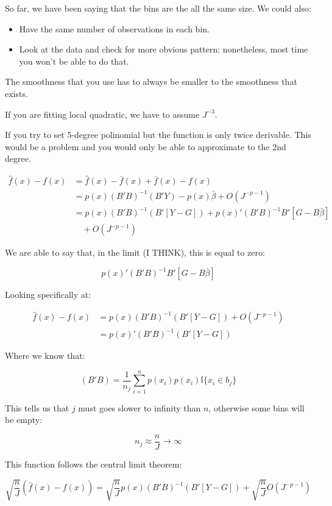 \documentclass{article}
\begin{document}
So far, we have been saying that the bins are the all the same size. We could also:

\begin{itemize}
    \item Have the same number of observations in each bin.
    \item Look at the data and check for more obvious pattern: nonetheless, most time you won't be able to do that.
\end{itemize}

The smoothness that you use has to always be smaller to the smoothness that exists.

If you are fitting local quadratic, we have to assume $J^{-3}$.

If you try to set 5-degree polinomial but the function is only twice derivable. This would be a problem and you would only be able to approximate to the 2nd degree.

\begin{align*}
    \hat{f}(x) - f(x) &= \hat{f}(x) - \bar{f}(x) + \bar{f}(x) - f(x) \\
    &= p(x) (B' B)^{-1} (B' Y) - p(x) \bar{\beta} + O(J^{-p-1}) \\
    &= p(x) (B' B)^{-1} (B' [Y-G]) + p(x)' (B' B)^{-1} B' [G - B \bar{\beta}] \\
    &\quad + O(J^{-p-1})
\end{align*}

We are able to say that, in the limit (I THINK), this is equal to zero:

$$
p(x)' (B' B)^{-1} B' [G - B \bar{\beta}] 
$$

Looking specifically at:

\begin{align*}
    \hat{f}(x) - f(x) &= p(x) (B' B)^{-1} (B' [Y-G]) + O(J^{-p-1}) \\
    &= p(x)' (B'B)^{-1} (B' [Y - G])
\end{align*}

Where we know that:

$$
(B'B) = \frac{1}{n_j} \sum_{i=1}^{n} p(x_i)p(x_i) \mathbb{I} \{ x_i \in b_j \}
$$

This tells us that $j$ must goes slower to infinity than $n$, otherwise some bins will be empty:

$$
n_j \approx \frac{n}{J} \to \infty
$$

This function follows the central limit theorem:

$$
\sqrt{\frac{n}{J}} (\hat{f}(x) - f(x)) = \sqrt{\frac{n}{J}} p(x) (B' B)^{-1} (B' [Y-G]) + \sqrt{\frac{n}{J}} O(J^{-p-1})
$$
\end{document}
